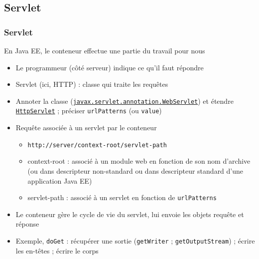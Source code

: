 \documentclass[english, french]{beamer}
\begin{document}
\subsection{Servlet}
\begin{frame}
	\frametitle{Servlet}
	En Java EE, le conteneur effectue une partie du travail pour nous
	\begin{itemize}
		\item Le programmeur (côté serveur) indique ce qu’il faut répondre
		\item Servlet (ici, HTTP) : classe qui traite les requêtes
		\item Annoter la classe ({\small\href{https://docs.oracle.com/javaee/7/api/index.html?javax/servlet/annotation/WebServlet.html}{\texttt{javax.servlet.annotation.WebServlet}}}) et étendre \href{https://docs.oracle.com/javaee/7/api/index.html?javax/servlet/http/HttpServlet.html}{\texttt{HttpServlet}} ; préciser \texttt{urlPatterns} (ou \texttt{value})
		\item Requête associée à un servlet par le conteneur
		\begin{itemize}
			\item \texttt{http://server/context-root/servlet-path}
			\item context-root : associé à un module web en fonction de son nom d’archive (ou dans descripteur non-standard ou dans descripteur standard d’une application Java EE)
			\item servlet-path : associé à un servlet en fonction de \texttt{urlPatterns}
		\end{itemize}
		\item Le conteneur gère le cycle de vie du servlet, lui envoie les objets requête et réponse
		\item Exemple, \texttt{doGet} : récupérer une sortie (\texttt{getWriter} ; \texttt{getOutputStream}) ; écrire les en-têtes ; écrire le corps
	\end{itemize}
\end{frame}
\end{document}
